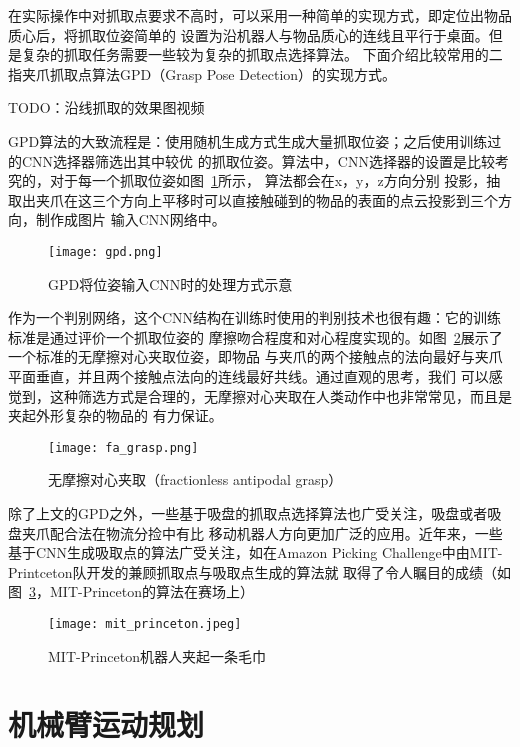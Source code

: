 在实际操作中对抓取点要求不高时，可以采用一种简单的实现方式，即定位出物品质心后，将抓取位姿简单的
设置为沿机器人与物品质心的连线且平行于桌面。但是复杂的抓取任务需要一些较为复杂的抓取点选择算法。
下面介绍比较常用的二指夹爪抓取点算法GPD（Grasp Pose Detection）\cite{ten2017grasp}的实现方式。

TODO：沿线抓取的效果图视频

GPD算法的大致流程是：使用随机生成方式生成大量抓取位姿；之后使用训练过的CNN选择器筛选出其中较优
的抓取位姿。算法中，CNN选择器的设置是比较考究的，对于每一个抓取位姿如图~\ref{fig:gpd}所示，
算法都会在x，y，z方向分别
投影，抽取出夹爪在这三个方向上平移时可以直接触碰到的物品的表面的点云投影到三个方向，制作成图片
输入CNN网络中。

\begin{figure}[h] %
  \centering
  \texttt{[image: gpd.png]}
  \caption{GPD将位姿输入CNN时的处理方式示意}
  \label{fig:gpd}
\end{figure}

作为一个判别网络，这个CNN结构在训练时使用的判别技术也很有趣：它的训练标准是通过评价一个抓取位姿的
摩擦吻合程度和对心程度实现的。如图~\ref{fig:fa_grasp}展示了一个标准的无摩擦对心夹取位姿，即物品
与夹爪的两个接触点的法向最好与夹爪平面垂直，并且两个接触点法向的连线最好共线。通过直观的思考，我们
可以感觉到，这种筛选方式是合理的，无摩擦对心夹取在人类动作中也非常常见，而且是夹起外形复杂的物品的
有力保证。


\begin{figure}[h] %
  \centering
  \texttt{[image: fa\_grasp.png]}
  \caption{无摩擦对心夹取（fractionless antipodal grasp）}
  \label{fig:fa_grasp}
\end{figure}

除了上文的GPD之外，一些基于吸盘的抓取点选择算法也广受关注，吸盘或者吸盘夹爪配合法在物流分捡中有比
移动机器人方向更加广泛的应用。近年来，一些基于CNN生成吸取点的算法广受关注，如在Amazon Picking 
Challenge中由MIT-Printceton队开发的兼顾抓取点与吸取点生成的算法\cite{zeng2018robotic}就
取得了令人瞩目的成绩（如图~\ref{fig:mit_princeton}，MIT-Princeton的算法在赛场上）

\begin{figure}[h] %
  \centering
  \texttt{[image: mit\_princeton.jpeg]}
  \caption{MIT-Princeton机器人夹起一条毛巾}
  \label{fig:mit_princeton}
\end{figure}

\section{机械臂运动规划}

